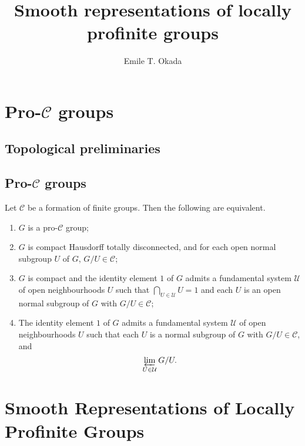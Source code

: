 \documentclass{memoir}
\title{Smooth representations of locally profinite groups}
\author{Emile T. Okada}
\begin{document}
\maketitle
\tableofcontents
\chapter{Pro-\texorpdfstring{$\mathcal C$}{C} groups}
\section{Topological preliminaries}
\section{Pro-\texorpdfstring{$\mathcal C$}{C} groups}
\begin{thm}
    Let $\mathcal C$ be a formation of finite groups.
    Then the following are equivalent.
    \begin{enumerate}
        \item $G$ is a pro-$\mathcal C$ group;
        \item $G$ is compact Hausdorff totally disconnected, and for each open normal subgroup $U$ of $G$, $G/U\in \mathcal C$;
        \item $G$ is compact and the identity element $1$ of $G$ admits a fundamental system $\mathcal U$ of open neighbourhoods $U$ such that $\bigcap_{U\in\mathcal U} U = 1$ and each $U$ is an open normal subgroup of $G$ with $G/U\in \mathcal C$;
        \item The identity element $1$ of $G$ admits a fundamental system $\mathcal U$ of open neighbourhoods $U$ such that each $U$ is a normal subgroup of $G$ with $G/U\in\mathcal C$, and 
            \begin{equation}
                \varprojlim_{U\in\mathcal U}G/U.
            \end{equation}
    \end{enumerate}
\end{thm}
\chapter{Smooth Representations of Locally Profinite Groups}
\end{document}
